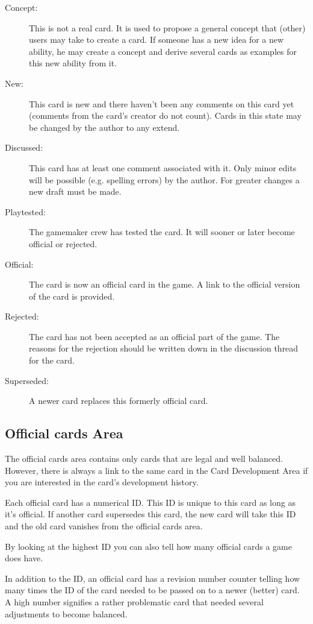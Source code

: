 \documentclass[a4paper, 11pt]{scrbook}
\begin{document}
\begin{description}
 \item[Concept:] This is not a real card. It is used to propose a general concept that (other) users may take to create a card. If someone has a new idea for a new ability, he may create a concept and derive several cards as examples for this new ability from it.
 \item[New:] This card is new and there haven't been any comments on this card yet (comments from the card's creator do not count). Cards in this state may be changed by the author to any extend.
 \item[Discussed:] This card has at least one comment associated with it. Only minor edits will be possible (e.g. spelling errors) by the author. For greater changes a new draft must be made. %
 \item[Playtested:] The gamemaker crew has tested the card. It will sooner or later become official or rejected.
 \item[Official:] The card is now an official card in the game. A link to the official version of the card is provided.
 \item[Rejected:] The card has not been accepted as an official part of the game. The reasons for the rejection should be written down in the discussion thread for the card.
 \item[Superseded:] A newer card replaces this formerly official card.
\end{description}

\subsection{Official cards Area}
The official cards area contains only cards that are legal and well balanced. However, there is always a link to the same card in the Card Development Area if you are interested in the card's development history.

Each official card has a numerical ID. This ID is unique to this card as long as it's official. If another card supersedes this card, the new card will take this ID and the old card vanishes from the official cards area.

By looking at the highest ID you can also tell how many official cards a game does have.

In addition to the ID, an official card has a revision number counter telling how many times the ID of the card needed to be passed on to a newer (better) card. A high number signifies a rather problematic card that needed several adjustments to become balanced.
\end{document}
